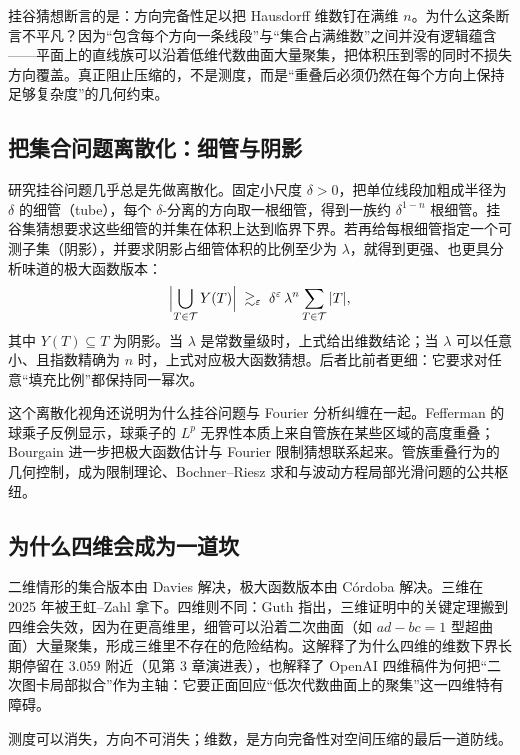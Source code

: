 \begin{keybox}[第一性原理]
挂谷猜想断言的是：方向完备性足以把 Hausdorff 维数钉在满维 $n$。为什么这条断言不平凡？因为“包含每个方向一条线段”与“集合占满维数”之间并没有逻辑蕴含——平面上的直线族可以沿着低维代数曲面大量聚集，把体积压到零的同时不损失方向覆盖。真正阻止压缩的，不是测度，而是“重叠后必须仍然在每个方向上保持足够复杂度”的几何约束。
\end{keybox}

\subsection{把集合问题离散化：细管与阴影}

研究挂谷问题几乎总是先做离散化。固定小尺度 $\delta>0$，把单位线段加粗成半径为 $\delta$ 的细管（tube），每个 $\delta$-分离的方向取一根细管，得到一族约 $\delta^{1-n}$ 根细管。挂谷集猜想要求这些细管的并集在体积上达到临界下界。若再给每根细管指定一个可测子集（阴影），并要求阴影占细管体积的比例至少为 $\lambda$，就得到更强、也更具分析味道的极大函数版本：
\begin{equation}
\Bigl|\bigcup_{T\in\mathcal{T}} Y(T)\Bigr| \;\gtrsim_\varepsilon\; \delta^{\varepsilon}\, \lambda^{n}\sum_{T\in\mathcal{T}}|T|,
\end{equation}
其中 $Y(T)\subseteq T$ 为阴影。当 $\lambda$ 是常数量级时，上式给出维数结论；当 $\lambda$ 可以任意小、且指数精确为 $n$ 时，上式对应极大函数猜想。后者比前者更细：它要求对任意“填充比例”都保持同一幂次。

这个离散化视角还说明为什么挂谷问题与 Fourier 分析纠缠在一起。Fefferman 的球乘子反例显示，球乘子的 $L^p$ 无界性本质上来自管族在某些区域的高度重叠；Bourgain 进一步把极大函数估计与 Fourier 限制猜想联系起来。管族重叠行为的几何控制，成为限制理论、Bochner--Riesz 求和与波动方程局部光滑问题的公共枢纽。

\subsection{为什么四维会成为一道坎}

二维情形的集合版本由 Davies 解决，极大函数版本由 C\'ordoba 解决。三维在 2025 年被王虹--Zahl 拿下。四维则不同：Guth 指出，三维证明中的关键定理搬到四维会失效，因为在更高维里，细管可以沿着二次曲面（如 $ad-bc=1$ 型超曲面）大量聚集，形成三维里不存在的危险结构。这解释了为什么四维的维数下界长期停留在 3.059 附近（见第 3 章演进表），也解释了 OpenAI 四维稿件为何把“二次图卡局部拟合”作为主轴：它要正面回应“低次代数曲面上的聚集”这一四维特有障碍。

\begin{keybox}[可记忆主句]
测度可以消失，方向不可消失；维数，是方向完备性对空间压缩的最后一道防线。
\end{keybox}